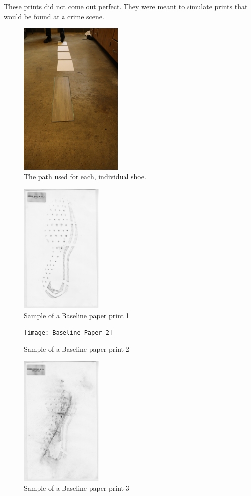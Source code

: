    These prints did not come out perfect. They were meant to simulate prints that would be found at a crime scene. 
   
\begin{figure}[!htp]
\centering
\includegraphics[width=5cm]{Path}
\caption{The path used for each, individual shoe.  }
\label{Image 17}
\end{figure}


\begin{figure}[!htp]
\centering
\includegraphics[width=4cm]{Baseline_Paper_1}
\caption{Sample of a Baseline paper print 1}
\label{Image 18}
\end{figure}

\begin{figure}[!htp]
\centering
\texttt{[image: Baseline\_Paper\_2]}
\caption{Sample of a Baseline paper print 2 }
\label{Image 19}
\end{figure}

\begin{figure}[!htp]
\centering
\includegraphics[width=4cm]{Baseline_Paper_3}
\caption{Sample of a Baseline paper print 3}
\label{Image 20}
\end{figure}

